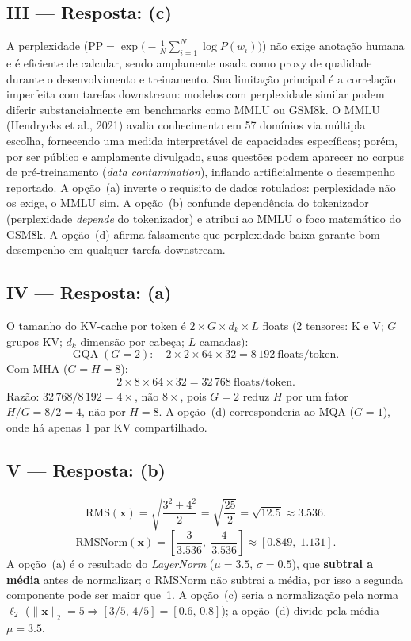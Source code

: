 \documentclass{dlproblemset}
\begin{document}
\subsection*{III — Resposta: (c)}
A perplexidade ($\mathrm{PP} = \exp\!\bigl(-\tfrac{1}{N}\sum_{i=1}^{N}\log P(w_i)\bigr)$)
não exige anotação humana e é eficiente de calcular, sendo amplamente usada como
proxy de qualidade durante o desenvolvimento e treinamento. Sua limitação principal
é a correlação imperfeita com tarefas downstream: modelos com perplexidade similar
podem diferir substancialmente em benchmarks como MMLU ou GSM8k. O MMLU
(Hendrycks et al., 2021) avalia conhecimento em 57 domínios via múltipla escolha,
fornecendo uma medida interpretável de capacidades específicas; porém, por ser
público e amplamente divulgado, suas questões podem aparecer no corpus de
pré-treinamento (\emph{data contamination}), inflando artificialmente o desempenho
reportado. A opção~(a) inverte o requisito de dados rotulados: perplexidade não os
exige, o MMLU sim. A opção~(b) confunde dependência do tokenizador (perplexidade
\emph{depende} do tokenizador) e atribui ao MMLU o foco matemático do GSM8k.
A opção~(d) afirma falsamente que perplexidade baixa garante bom desempenho em
qualquer tarefa downstream.

\subsection*{IV — Resposta: (a)}
O tamanho do KV-cache por token é $2 \times G \times d_k \times L$ floats
(2 tensores: K e V; $G$ grupos KV; $d_k$ dimensão por cabeça; $L$ camadas):
\[
  \text{GQA}\;(G{=}2):\quad 2 \times 2 \times 64 \times 32 = 8\,192\ \text{floats/token}.
\]
Com MHA ($G = H = 8$):
\[
  2 \times 8 \times 64 \times 32 = 32\,768\ \text{floats/token}.
\]
Razão: $32\,768 / 8\,192 = 4\times$, não $8\times$, pois $G{=}2$ reduz $H$ por
um fator $H/G = 8/2 = 4$, não por $H = 8$. A opção~(d) corresponderia ao
MQA ($G{=}1$), onde há apenas 1 par KV compartilhado.

\subsection*{V — Resposta: (b)}
\[
  \mathrm{RMS}(\mathbf{x})
    = \sqrt{\frac{3^2 + 4^2}{2}}
    = \sqrt{\frac{25}{2}}
    = \sqrt{12.5}
    \approx 3.536.
\]
\[
  \mathrm{RMSNorm}(\mathbf{x})
    = \left[\frac{3}{3.536},\;\frac{4}{3.536}\right]
    \approx [0.849,\;1.131].
\]
A opção~(a) é o resultado do \emph{LayerNorm} ($\mu = 3.5$, $\sigma = 0.5$),
que \textbf{subtrai a média} antes de normalizar; o RMSNorm não subtrai a média,
por isso a segunda componente pode ser maior que~1. A opção~(c) seria a normalização
pela norma $\ell_2$ ($\|\mathbf{x}\|_2 = 5 \Rightarrow [3/5,\,4/5] = [0.6,\,0.8]$);
a opção~(d) divide pela média $\mu = 3.5$.
\end{document}
